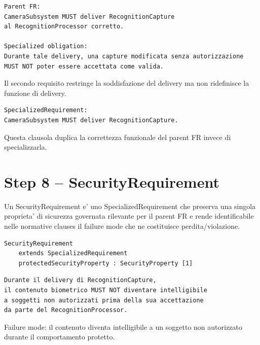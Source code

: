 \documentclass[11pt,a4paper]{article}
\begin{document}
\begin{goodbox}
\begin{lstlisting}
Parent FR:
CameraSubsystem MUST deliver RecognitionCapture
al RecognitionProcessor corretto.

Specialized obligation:
Durante tale delivery, una capture modificata senza autorizzazione
MUST NOT poter essere accettata come valida.
\end{lstlisting}
Il secondo requisito restringe la soddisfazione del delivery ma non ridefinisce la funzione di delivery.
\end{goodbox}

\begin{badbox}
\begin{lstlisting}
SpecializedRequirement:
CameraSubsystem MUST deliver RecognitionCapture.
\end{lstlisting}
Questa clausola duplica la correttezza funzionale del parent FR invece di specializzarla.
\end{badbox}

\section{Step 8 -- SecurityRequirement}

\begin{statusclosed}[S2 CLOSED]
Un SecurityRequirement e' uno SpecializedRequirement che preserva una singola proprieta' di sicurezza governata rilevante per il parent FR e rende identificabile nelle normative clauses il failure mode che ne costituisce perdita/violazione.
\end{statusclosed}

\begin{lstlisting}
SecurityRequirement
    extends SpecializedRequirement
    protectedSecurityProperty : SecurityProperty [1]
\end{lstlisting}

\begin{goodbox}
\begin{lstlisting}
Durante il delivery di RecognitionCapture,
il contenuto biometrico MUST NOT diventare intelligibile
a soggetti non autorizzati prima della sua accettazione
da parte del RecognitionProcessor.
\end{lstlisting}
Failure mode: il contenuto diventa intelligibile a un soggetto non autorizzato durante il comportamento protetto.
\end{goodbox}
\end{document}
